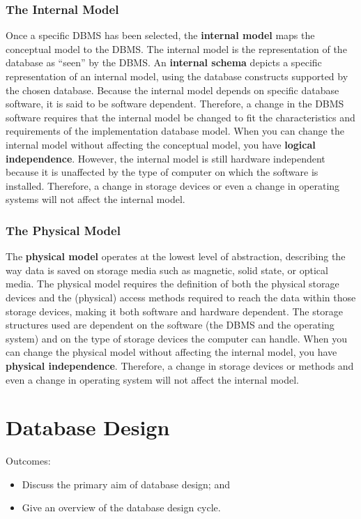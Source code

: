 \documentclass[a4paper, 12pt, titlepage]{report}
\begin{document}
\subsection{The Internal Model}
Once a specific DBMS has been selected, the \textbf{internal model} maps the conceptual model to the DBMS. The internal model is the representation of the database as “seen” by the DBMS. An \textbf{internal schema} depicts a specific representation of an internal model, using the database constructs supported by the chosen database. Because the internal model depends on specific database software, it is said to be software dependent. Therefore, a change in the DBMS software requires that the internal model be changed to fit the characteristics and requirements of the implementation database model. When you can change the internal model without affecting the conceptual model, you have \textbf{logical independence}. However, the internal model is still hardware independent because it is unaffected by the type of computer on which the software is installed. Therefore, a change in storage devices or even a change in operating systems will not affect the internal model.
\subsection{The Physical Model}
The \textbf{physical model} operates at the lowest level of abstraction, describing the way data is saved on storage media such as magnetic, solid state, or optical media. The physical model requires the definition of both the physical storage devices and the (physical) access methods required to reach the data within those storage devices, making it both software and hardware dependent. The storage structures used are dependent on the software (the DBMS and the operating system) and on the type of storage devices the computer can handle. When you can change the physical model without affecting the internal model, you have \textbf{physical independence}. Therefore, a change in storage devices or methods and even a change in operating system will not affect the internal model.
\chapter{Database Design}
Outcomes:
\begin{itemize}
\item Discuss the primary aim of database design; and
\item Give an overview of the database design cycle.
\end{itemize}
\end{document}
